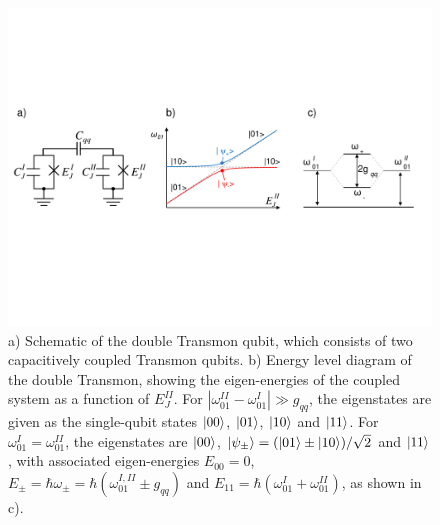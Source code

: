 \begin{figure}[ht!]
	\centering
	\includegraphics[width=\textwidth]{./material/figures/scalable-architecture/double_transmon_schematic}
	\caption{a) Schematic of the double Transmon qubit, which consists of two capacitively coupled Transmon qubits. b) Energy level diagram of the double Transmon, showing the eigen-energies of the coupled system as a function of $E_J^{II}$. For $|\omega_{01}^{II}-\omega_{01}^{I}|\gg g_{qq}$, the eigenstates are given as the single-qubit states $\left| 00 \right>$, $\left| 01 \right>$, $\left| 10 \right>$ and $\left| 11 \right>$. For $\omega_{01}^I = \omega_{01}^{II}$, the eigenstates are $\left| 00 \right>$, $\left| \psi_\pm \right>=(\left| 01 \right>\pm\left| 10 \right>)/\sqrt{2}$ and $\left| 11 \right>$, with associated eigen-energies $E_{00}=0$, $E_\pm = \hbar\omega_\pm = \hbar(\omega_{01}^{I,II}\pm g_{qq})$ and $E_{11}=\hbar(\omega_{01}^I+\omega_{01}^{II})$, as shown in c).}
	\label{fig:qubit_molecule_schematic}
\end{figure}

